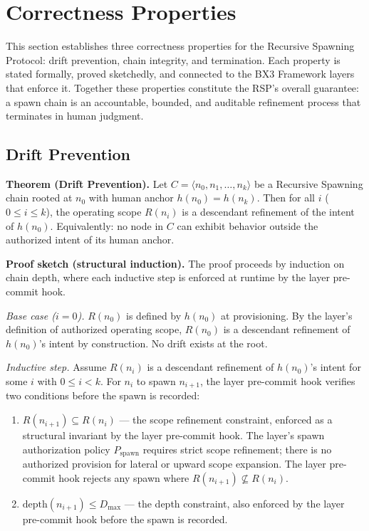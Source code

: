 \section{Correctness Properties}
\label{sec:rs-correctness}

This section establishes three correctness properties for the Recursive Spawning Protocol: drift prevention, chain integrity, and termination. Each property is stated formally, proved sketchedly, and connected to the BX3 Framework layers that enforce it. Together these properties constitute the RSP's overall guarantee: a spawn chain is an accountable, bounded, and auditable refinement process that terminates in human judgment.

\subsection{Drift Prevention}
\label{sec:rs-drift-prevention}

\medskip
\noindent\textbf{Theorem (Drift Prevention).} Let $C = \langle n_0, n_1, \ldots, n_k \rangle$ be a Recursive Spawning chain rooted at $n_0$ with human anchor $h(n_0) = h(n_k)$. Then for all $i$ ($0 \leq i \leq k$), the operating scope $R(n_i)$ is a descendant refinement of the intent of $h(n_0)$. Equivalently: no node in $C$ can exhibit behavior outside the authorized intent of its human anchor.

\medskip
\noindent\textbf{Proof sketch (structural induction).} The proof proceeds by induction on chain depth, where each inductive step is enforced at runtime by the \fact{} layer pre-commit hook.

\medskip
\textit{Base case ($i=0$).} $R(n_0)$ is defined by $h(n_0)$ at provisioning. By the \purpose{} layer's definition of authorized operating scope, $R(n_0)$ is a descendant refinement of $h(n_0)$'s intent by construction. No drift exists at the root.

\medskip
\textit{Inductive step.} Assume $R(n_i)$ is a descendant refinement of $h(n_0)$'s intent for some $i$ with $0 \leq i < k$. For $n_i$ to spawn $n_{i+1}$, the \fact{} layer pre-commit hook verifies two conditions before the spawn is recorded:

\begin{enumerate}
    \item[(a)] $R(n_{i+1}) \subseteq R(n_i)$ --- the scope refinement constraint, enforced as a structural invariant by the \fact{} layer pre-commit hook. The \purpose{} layer's spawn authorization policy $P_{\mathrm{spawn}}$ requires strict scope refinement; there is no authorized provision for lateral or upward scope expansion. The \fact{} layer pre-commit hook rejects any spawn where $R(n_{i+1}) \not\subseteq R(n_i)$.
    \item[(b)] $\mathrm{depth}(n_{i+1}) \leq D_{\mathrm{max}}$ --- the depth constraint, also enforced by the \fact{} layer pre-commit hook before the spawn is recorded.
\end{enumerate}


